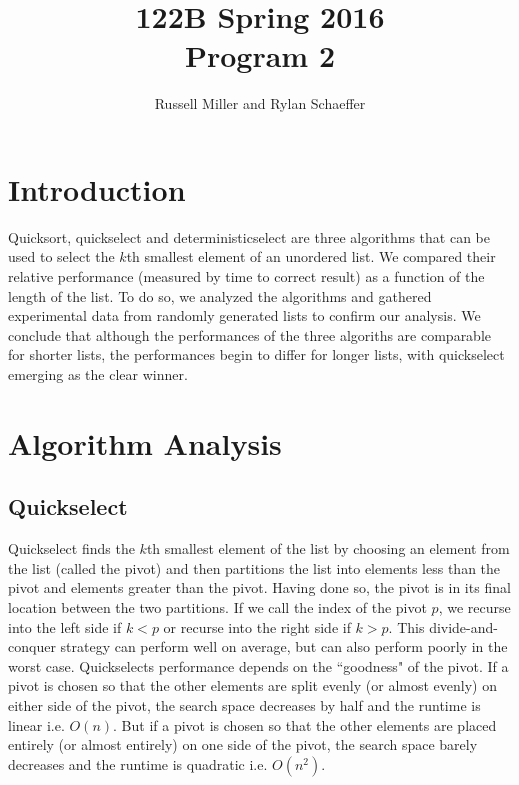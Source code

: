 \documentclass{article}
\title{122B Spring 2016 \\ Program 2}
\author{Russell Miller and Rylan Schaeffer }
\begin{document}
\maketitle

\section*{Introduction}
\indent \indent Quicksort, quickselect and deterministicselect are three algorithms that can be used to select the $k$th smallest element of an unordered list. We compared their relative performance (measured by time to correct result) as a function of the length of the list. To do so, we analyzed the algorithms and gathered experimental data from randomly generated lists to confirm our analysis. We conclude that although the performances of the three algoriths are comparable for shorter lists, the performances begin to differ for longer lists, with quickselect emerging as the clear winner.

\section*{Algorithm Analysis}
\subsection*{Quickselect}
\indent \indent Quickselect finds the $k$th smallest element of the list by choosing an element from the list (called the pivot) and then partitions the list into elements less than the pivot and elements greater than the pivot. Having done so, the pivot is in its final location between the two partitions. If we call the index of the pivot $p$, we recurse into the left side if $k < p$ or recurse into the right side if $k > p$. This divide-and-conquer strategy can perform well on average, but can also perform poorly in the worst case. Quickselects performance depends on the ``goodness" of the pivot. If a pivot is chosen so that the other elements are split evenly (or almost evenly) on either side of the pivot, the search space decreases by half and the runtime is linear i.e. $O(n)$. But if a pivot is chosen so that the other elements are placed entirely (or almost entirely) on one side of the pivot, the search space barely decreases and the runtime is quadratic i.e. $O(n^2)$.
\end{document}
